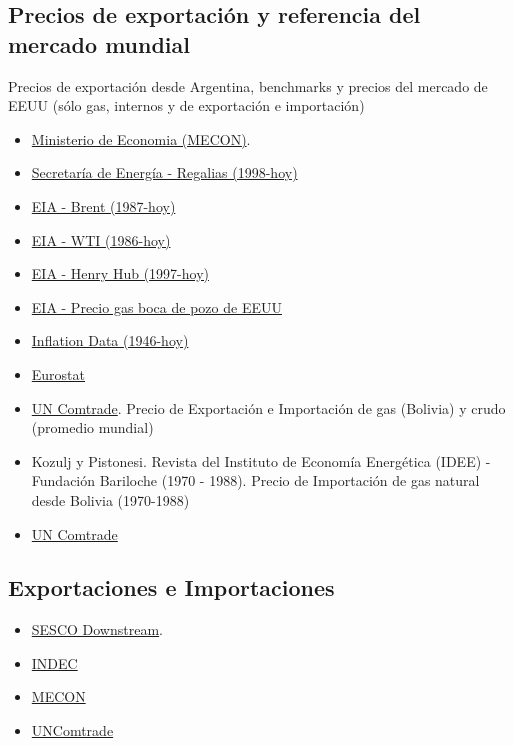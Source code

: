 \documentclass[letterpaper,11pt, spanish]{scrartcl}
\begin{document}
\subsection{Precios de exportación y referencia del mercado mundial}
Precios de exportación desde Argentina, benchmarks y precios del mercado de EEUU (sólo gas, internos y de exportación e importación)

\begin{itemize}
    \item \hyperlink{http://datos.minem.gob.ar/dataset/precio-de-exportacion-de-petroleo-crudo}{Ministerio de Economia (MECON)}.
    \item \hyperlink{http://datos.minem.gob.ar/dataset/regalias-de-petroleo-crudo-gas-natural-glp-gasolina-y-condensado}{Secretaría de Energía - Regalias (1998-hoy)}
    \item \hyperlink{https://www.eia.gov/dnav/pet/hist/RBRTED.htm}{EIA - Brent (1987-hoy)} 
    \item \hyperlink{https://www.eia.gov/dnav/pet/hist/rwtcD.htm}{EIA - WTI (1986-hoy)}
    \item \hyperlink{(https://www.eia.gov/dnav/ng/hist/rngwhhdd.htm}{EIA - Henry Hub (1997-hoy)}
    \item \hyperlink{(https://www.eia.gov/dnav/ng/hist/n9190us3A.htm}{EIA - Precio gas boca de pozo de EEUU}
    \item \hyperlink{https://inflationdata.com/articles/inflation-adjusted-prices/historical-crude-oil-prices-table/)}{Inflation Data (1946-hoy)}
    \item \hyperlink{https://ec.europa.eu/eurostat/web/energy/data/database}{Eurostat}
    \item \hyperlink{https://comtrade.un.org/data/}{UN Comtrade}. Precio de Exportación e Importación de gas (Bolivia) y crudo (promedio mundial)
    \item Kozulj y Pistonesi. Revista  del Instituto de Economía Energética (IDEE) - Fundación Bariloche  (1970 - 1988). Precio de Importación de gas natural desde Bolivia (1970-1988)    
    \item \hyperlink{https://comtrade.un.org/data/}{UN Comtrade}
\end{itemize}

\subsection{Exportaciones e Importaciones}


\begin{itemize}
    \item \hyperlink{https://datos.gob.ar/dataset/energia-refinacion-comercializacion-petroleo-gas-derivados-tablas-dinamicas}{SESCO Downstream}.
    \item \hyperlink{}{INDEC}
    \item \hyperlink{}{MECON}
    \item \hyperlink{}{UNComtrade}

\end{itemize}
\end{document}

